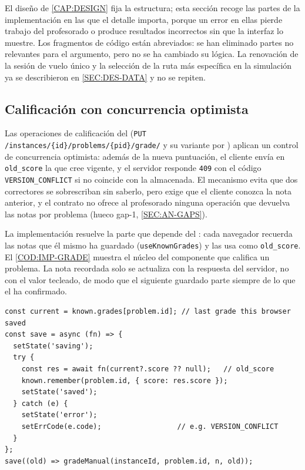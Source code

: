 El diseño de \cref{CAP:DESIGN} fija la estructura; esta sección recoge las partes de la
implementación en las que el detalle importa, porque un error en ellas pierde trabajo del
profesorado o produce resultados incorrectos sin que la interfaz lo muestre. Los
fragmentos de código están abreviados: se han eliminado partes no relevantes para el
argumento, pero no se ha cambiado su lógica. La renovación de la sesión de vuelo único y la
selección de la ruta más específica en la simulación ya se describieron en
\cref{SEC:DES-DATA} y no se repiten.

\subsection{Calificación con concurrencia optimista}

Las operaciones de calificación del  (\texttt{PUT
/instances/\{id\}/problems/\{pid\}/grade/} y su variante por ) aplican un
control de concurrencia optimista: además de la nueva puntuación, el cliente envía en
\texttt{old\_score} la que cree vigente, y el servidor responde \texttt{409} con el código
\texttt{VERSION\_CONFLICT} si no coincide con la almacenada. El mecanismo evita que dos
correctores se sobrescriban sin saberlo, pero exige que el cliente conozca la nota anterior,
y el contrato no ofrece al profesorado ninguna operación que devuelva las notas por problema
(hueco gap-1, \cref{SEC:AN-GAPS}).

La implementación resuelve la parte que depende del : cada navegador recuerda
las notas que él mismo ha guardado (\texttt{useKnownGrades}) y las usa como
\texttt{old\_score}. El \cref{COD:IMP-GRADE} muestra el núcleo del componente que califica un
problema. La nota recordada solo se actualiza con la respuesta del servidor, no con el
valor tecleado, de modo que el siguiente guardado parte siempre de lo que el
 ha confirmado.

\begin{lstlisting}[caption={Guardado de una nota con \texttt{old\_score}
  (\texttt{features/grading/ProblemGrader.jsx}).},label={COD:IMP-GRADE}]
const current = known.grades[problem.id]; // last grade this browser saved
const save = async (fn) => {
  setState('saving');
  try {
    const res = await fn(current?.score ?? null);   // old_score
    known.remember(problem.id, { score: res.score });
    setState('saved');
  } catch (e) {
    setState('error');
    setErrCode(e.code);                  // e.g. VERSION_CONFLICT
  }
};
save((old) => gradeManual(instanceId, problem.id, n, old));
\end{lstlisting}

